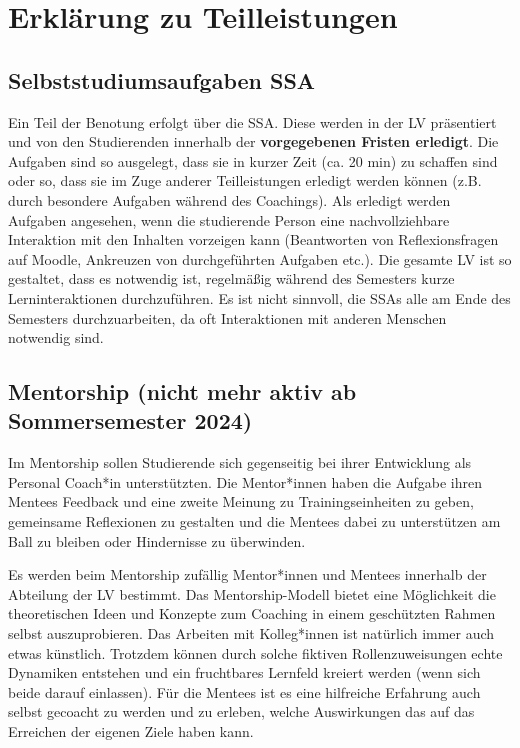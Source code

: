 \documentclass[
  letterpaper,
  DIV=11,
  numbers=noendperiod]{scrreprt}
\begin{document}
\endgroup{}


\chapter{Erklärung zu Teilleistungen}\label{sec-teilleistungen}

\section{Selbststudiumsaufgaben SSA}\label{sec-selbststudiumsaufgaben}

Ein Teil der Benotung erfolgt über die SSA. Diese werden in der LV
präsentiert und von den Studierenden innerhalb der \textbf{vorgegebenen
Fristen erledigt}. Die Aufgaben sind so ausgelegt, dass sie in kurzer
Zeit (ca. 20 min) zu schaffen sind oder so, dass sie im Zuge anderer
Teilleistungen erledigt werden können (z.B. durch besondere Aufgaben
während des Coachings). Als erledigt werden Aufgaben angesehen, wenn die
studierende Person eine nachvollziehbare Interaktion mit den Inhalten
vorzeigen kann (Beantworten von Reflexionsfragen auf Moodle, Ankreuzen
von durchgeführten Aufgaben etc.). Die gesamte LV ist so gestaltet, dass
es notwendig ist, regelmäßig während des Semesters kurze
Lerninteraktionen durchzuführen. Es ist nicht sinnvoll, die SSAs alle am
Ende des Semesters durchzuarbeiten, da oft Interaktionen mit anderen
Menschen notwendig sind.

\section{Mentorship (nicht mehr aktiv ab Sommersemester
2024)}\label{sec-mentorship}

Im Mentorship sollen Studierende sich gegenseitig bei ihrer Entwicklung
als Personal Coach*in unterstützten. Die Mentor*innen haben die Aufgabe
ihren Mentees Feedback und eine zweite Meinung zu Trainingseinheiten zu
geben, gemeinsame Reflexionen zu gestalten und die Mentees dabei zu
unterstützen am Ball zu bleiben oder Hindernisse zu überwinden.

Es werden beim Mentorship zufällig Mentor*innen und Mentees innerhalb
der Abteilung der LV bestimmt. Das Mentorship-Modell bietet eine
Möglichkeit die theoretischen Ideen und Konzepte zum Coaching in einem
geschützten Rahmen selbst auszuprobieren. Das Arbeiten mit Kolleg*innen
ist natürlich immer auch etwas künstlich. Trotzdem können durch solche
fiktiven Rollenzuweisungen echte Dynamiken entstehen und ein fruchtbares
Lernfeld kreiert werden (wenn sich beide darauf einlassen). Für die
Mentees ist es eine hilfreiche Erfahrung auch selbst gecoacht zu werden
und zu erleben, welche Auswirkungen das auf das Erreichen der eigenen
Ziele haben kann.
\end{document}
